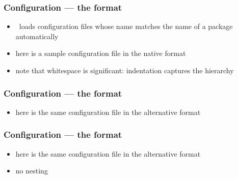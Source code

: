\begin{frame}[fragile]
%
  \label{frame:srtm-pfg}
%
  \frametitle{Configuration --- the  format}
%
  \begin{itemize}
%
    \item \pyre\ loads configuration files whose name matches the name of a package automatically
%
    \item here is a sample configuration file in the native  format
%
%
    \item note that whitespace is significant: indentation captures the hierarchy
%
  \end{itemize}
%
\end{frame}

\begin{frame}[fragile]
%
  \label{frame:srtm-pml}
%
  \frametitle{Configuration --- the  format}
%
  \begin{itemize}
%
    \item here is the same configuration file in the alternative  format
%
%
  \end{itemize}
%
\end{frame}

\begin{frame}[fragile]
%
  \label{frame:srtm-cfg}
%
  \frametitle{Configuration --- the  format}
%
  \begin{itemize}
%
    \item here is the same configuration file in the alternative  format
%
%
    \item no nesting
%
  \end{itemize}
%
\end{frame}

